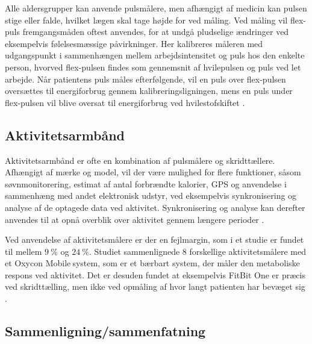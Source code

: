 Alle aldersgrupper kan anvende pulsmålere, men afhængigt af medicin kan pulsen stige eller falde, hvilket lægen skal tage højde for ved måling. Ved måling vil flex-puls fremgangsmåden oftest anvendes, for at undgå pludselige ændringer ved eksempelvis følelsesmæssige påvirkninger. Her kalibreres måleren med udgangspunkt i sammenhængen mellem arbejdsintensitet og puls hos den enkelte person, hvorved flex-pulsen findes som gennemsnit af hvilepulsen og puls ved let arbejde. Når patientens puls måles efterfølgende, vil en puls over flex-pulsen oversættes til energiforbrug gennem kalibreringsligningen, mens en puls under flex-pulsen vil blive oversat til energiforbrug ved hvilestofskiftet \citep{motionsraad2007}.


\subsection{Aktivitetsarmbånd}

Aktivitetsarmbånd er ofte en kombination af pulsmålere og skridttællere. Afhængigt af mærke og model, vil der være mulighed for flere funktioner, såsom søvnmonitorering, estimat af antal forbrændte kalorier, GPS og anvendelse i sammenhæng med andet elektronisk udstyr, ved eksempelvis synkronisering og analyse af de optagede data ved aktivitet. Synkronisering og analyse kan derefter anvendes til at opnå overblik over aktivitet gennem længere perioder \citep{pedersen2011, rudner2016, chiauzzi2014}.

Ved anvendelse af aktivitetsmålere er der en fejlmargin, som i et studie er fundet til mellem $9~\%$ og $24~\%$. Studiet sammenlignede $8$ forskellige aktivitetsmålere med et Oxycon Mobile\textregistered$~$system, som er et bærbart system, der måler den metaboliske respons ved aktivitet. Det er desuden fundet at eksempelvis FitBit One er præcis ved skridttælling, men ikke ved opmåling af hvor langt patienten har bevæget sig \citep{chiauzzi2014}.

\subsection{Sammenligning/sammenfatning}

